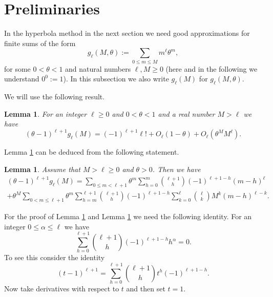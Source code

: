 \documentclass[11pt]{article}
\numberwithin{equation}{section}
\let\tet\theta
\newtheorem{lemma}[theorem]{Lemma}
\theoremstyle{definition}
\numberwithin{theorem}{section}
\begin{document}
\section{Preliminaries}
\label{sec:preliminaries}

In the hyperbola method in the next section we need good approximations for finite sums of the form
\[
g_\ell (M,\tet):=\sum_{0\leq m\leq M} m^\ell \tet^m,
\]
for some $0<\tet <1$ and natural numbers $\ell,M\geq 0$ (here and in the following we understand $0^0:=1$).
In this subsection we also write $g_\ell(M)$ for $g_\ell(M,\tet)$.

We will use the following result.

\begin{lemma}\label{lemgl2}
For an integer $\ell\geq 0$ and $0<\tet < 1$ and a real number $M>\ell$ we have
\[
(\tet -1)^{\ell+1}g_\ell(M)=(-1)^{\ell+1} \ell! +O_\ell(1-\tet)+O_\ell (\tet^M M^\ell).
\]
\end{lemma}

Lemma \ref{lemgl2} can be deduced from the following statement.

\begin{lemma}\label{lemgl}
Assume that $M>\ell\geq 0$ and $\tet >0$. Then we have
\begin{multline*}
(\tet -1)^{\ell+1}g_\ell(M)= \sum_{0\leq m<\ell+1}\tet^m \sum_{h=0}^m \binom{\ell+1}{h}(-1)^{\ell+1-h}(m-h)^\ell \\
+ \tet^M \sum_{0<m\leq \ell+1}\tet^m \sum_{h=m}^{\ell+1}\binom{\ell+1}{h}(-1)^{\ell+1-h}\sum_{k=0}^\ell \binom{\ell}{k} M^k (m-h)^{\ell-k}.
\end{multline*}
\end{lemma}

For the proof of Lemma \ref{lemgl} and Lemma \ref{lemgl2} we need the following identity. For an integer $0\leq \alpha\leq \ell$ we have
\begin{equation}\label{eqnbinom}
\sum_{h=0}^{\ell+1}\binom{\ell+1}{h} (-1)^{\ell+1-h}h^\alpha =0.
\end{equation}
To see this consider the identity
\[
(t-1)^{\ell+1}=\sum_{h=0}^{\ell+1}\binom{\ell+1}{h} t^h (-1)^{\ell+1-h}.
\]
Now take derivatives with respect to $t$ and then set $t=1$.\par
\end{document}
